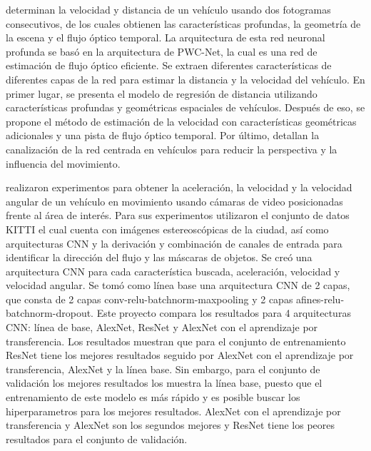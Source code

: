 \citeauthor{song2020Learning} determinan la velocidad y distancia de un vehículo usando dos fotogramas consecutivos, de los cuales obtienen las  características profundas, la geometría de la escena y el flujo óptico temporal. La arquitectura de esta red neuronal profunda se basó en la arquitectura de PWC-Net, la cual es una red de estimación de flujo óptico eficiente. Se extraen diferentes características de diferentes capas de la red para estimar la distancia y la velocidad del vehículo. En primer lugar, se presenta el modelo de regresión de distancia utilizando características profundas y geométricas espaciales de vehículos. Después de eso, se propone el método de estimación de la velocidad con características geométricas adicionales y una pista de flujo óptico temporal. Por último, detallan la canalización de la red centrada en vehículos para reducir la perspectiva y la influencia del movimiento.

\citeauthor{zhang2017Vehicle} realizaron experimentos para obtener la aceleración, la velocidad y la velocidad angular de un vehículo en movimiento usando cámaras de video posicionadas frente al área de interés. Para sus experimentos utilizaron el conjunto de datos KITTI el cual cuenta con imágenes estereoscópicas de la ciudad, así como arquitecturas CNN y la derivación y combinación de canales de entrada para identificar la dirección del flujo y las máscaras de objetos. Se creó una arquitectura CNN para cada característica buscada, aceleración, velocidad y velocidad angular. Se tomó como línea base una arquitectura CNN de 2 capas, que consta de 2 capas conv-relu-batchnorm-maxpooling y 2 capas afines-relu-batchnorm-dropout. Este proyecto compara los resultados para 4 arquitecturas CNN: línea de base, AlexNet, ResNet y AlexNet con el aprendizaje por transferencia.  Los resultados muestran que para el conjunto de entrenamiento ResNet tiene los mejores resultados seguido por AlexNet con el aprendizaje por transferencia, AlexNet y la línea base. Sin embargo, para el conjunto de validación  los mejores resultados los muestra la línea base, puesto que el entrenamiento de este modelo es más rápido y es posible buscar los hiperparametros para los mejores resultados. AlexNet con el aprendizaje por transferencia y AlexNet son los segundos mejores y ResNet tiene los peores resultados para el conjunto de validación.

